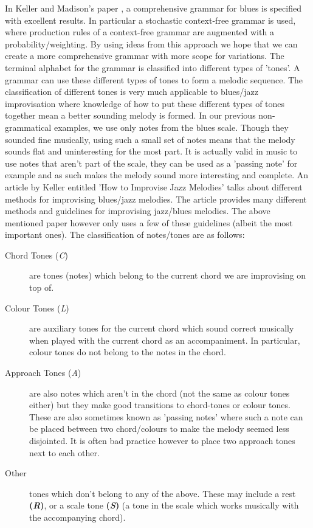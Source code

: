 \documentclass[pdftex,12pt,a4paper]{report}
\begin{document}
In Keller and Madison's paper \cite{keller07}, a comprehensive grammar for blues is specified with excellent results. In particular a stochastic context-free grammar is used, where production rules of a context-free grammar are augmented with a probability/weighting. By using ideas from this approach we hope that we can create a more comprehensive grammar with more scope for variations. The terminal alphabet for the grammar is classified into different types of 'tones'. A grammar can use these different types of tones to form a melodic sequence. The classification of different tones is very much applicable to blues/jazz improvisation where knowledge of how to put these different types of tones together mean a better sounding melody is formed. In our previous non-grammatical examples, we use only notes from the blues scale. Though they sounded fine musically, using such a small set of notes means that the melody sounds flat and uninteresting for the most part. It is actually valid in music to use notes that aren't part of the scale, they can be used as a 'passing note' for example and as such makes the melody sound more interesting and complete. An article by Keller entitled 'How to Improvise Jazz Melodies' \cite{jazzkeller} talks about different methods for improvising blues/jazz melodies. The article provides many different methods and guidelines for improvising jazz/blues melodies. The above mentioned paper \cite{keller07} however only uses a few of these guidelines (albeit the most important ones). The classification of notes/tones are as follows:

\begin{description}
  \item[Chord Tones (\textit{C})] are tones (notes) which belong to the current chord we are improvising on top of.
  \item[Colour Tones (\textit{L})] are auxiliary tones for the current chord which sound correct musically when played with the current chord as an accompaniment. In particular, colour tones do not belong to the notes in the chord. 
  \item[Approach Tones (\textit{A})] are also notes which aren't in the chord (not the same as colour tones either) but they make good transitions to chord-tones or colour tones. These are also sometimes known as 'passing notes' where such a note can be placed between two chord/colours to make the melody seemed less disjointed. It is often bad practice however to place two approach tones next to each other.
  \item[Other] tones which don't belong to any of the above. These may include a rest \textbf{(\textit{R})}, or a scale tone \textbf{(\textit{S})} (a tone in the scale which works musically with the accompanying chord).
\end{description}
\end{document}
